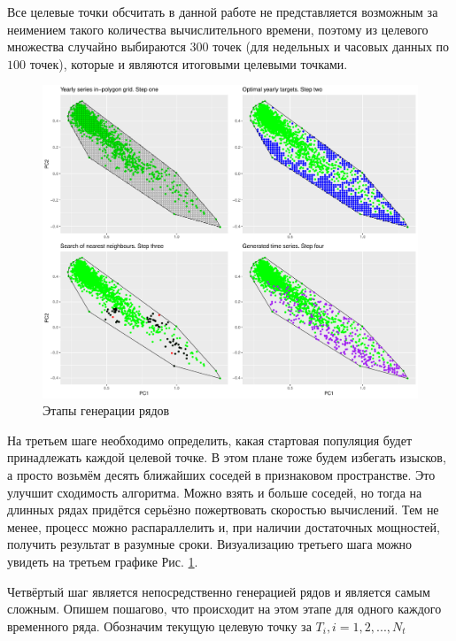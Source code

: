 \documentclass[a4paper,12pt]{article}
\begin{document}
Все целевые точки обсчитать в данной работе не представляется возможным за неимением такого количества вычислительного времени, поэтому из целевого множества случайно выбираются $ 300 $ точек (для недельных и часовых данных по $ 100 $ точек), которые и являются итоговыми целевыми точками.
\begin{figure}[!h]
	
	\begin{center}
		\includegraphics[width=
		\textwidth]{generation_grid}%
		\caption{Этапы генерации  рядов}
		\label{gen}
	\end{center}
\end{figure} 

На третьем шаге необходимо определить, какая стартовая популяция будет принадлежать каждой целевой точке. В этом плане тоже будем избегать изысков, а просто возьмём десять ближайших соседей в признаковом пространстве. Это улучшит сходимость алгоритма. Можно взять и больше соседей, но тогда на длинных рядах придётся серьёзно пожертвовать скоростью вычислений. Тем не менее, процесс можно распараллелить и, при наличии достаточных мощностей, получить результат в разумные сроки. Визуализацию третьего шага можно увидеть на третьем графике Рис. \ref{gen}.

Четвёртый шаг является непосредственно генерацией рядов и является самым сложным.	Опишем пошагово, что происходит на этом этапе для одного каждого временного ряда. Обозначим текущую целевую точку за $ T_i, i = 1, 2, ..., N_t $
\end{document}
